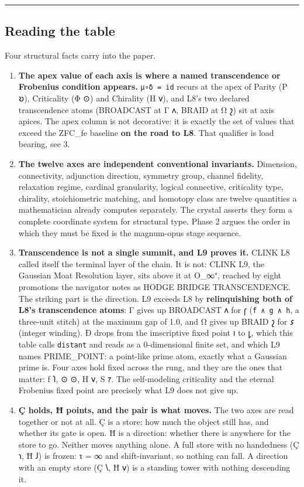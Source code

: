 \documentclass[12pt,a4paper]{article}
\begin{document}
\begin{center}\rule{0.5\linewidth}{0.5pt}\end{center}

\hypertarget{reading-the-table}{%
\subsection{Reading the table}\label{reading-the-table}}

Four structural facts carry into the paper.

\begin{enumerate}
\def\labelenumi{\arabic{enumi}.}
\item
  \textbf{The apex value of each axis is where a named transcendence or
  Frobenius condition appears.} \texttt{μ∘δ\ =\ id} recurs at the apex
  of Parity (P 𐑹), Criticality (Φ ⊙) and Chirality (H 𐑫), and L8's two
  declared transcendence atoms (BROADCAST at Γ 𐑵, BRAID at Ω 𐑟) sit at
  axis apices. The apex column is not decorative: it is exactly the set
  of values that exceed the ZFC\_fe baseline \textbf{on the road to L8}.
  That qualifier is load bearing, see 3.
\item
  \textbf{The twelve axes are independent conventional invariants.}
  Dimension, connectivity, adjunction direction, symmetry group, channel
  fidelity, relaxation regime, cardinal granularity, logical connective,
  criticality type, chirality, stoichiometric matching, and homotopy
  class are twelve quantities a mathematician already computes
  separately. The crystal asserts they form a complete coordinate system
  for structural type. Phase 2 argues the order in which they must be
  fixed is the magnum-opus stage sequence.
\item
  \textbf{Transcendence is not a single summit, and L9 proves it.} CLINK
  L8 called itself the terminal layer of the chain. It is not: CLINK L9,
  the Gaussian Moat Resolution layer, sits above it at O\_∞⁺, reached by
  eight promotions the navigator notes as HODGE BRIDGE TRANSCENDENCE.
  The striking part is the direction. L9 exceeds L8 by
  \textbf{relinquishing both of L8's transcendence atoms}: Γ gives up
  BROADCAST 𐑵 for 𐑝 (\texttt{f\ ∧\ g\ ∧\ h}, a three-unit stitch) at the
  maximum gap of 1.0, and Ω gives up BRAID 𐑟 for 𐑭 (integer winding). Ð
  drops from the imscriptive fixed point 𐑦 to 𐑛, which this table calls
  \texttt{distant} and reads as a 0-dimensional finite set, and which L9
  names PRIME\_POINT: a point-like prime atom, exactly what a Gaussian
  prime is. Four axes hold fixed across the rung, and they are the ones
  that matter: ƒ 𐑐, ⊙ ⊙, H 𐑫, S 𐑳. The self-modeling criticality and the
  eternal Frobenius fixed point are precisely what L9 does not give up.
\item
  \textbf{Ç holds, Ħ points, and the pair is what moves.} The two axes
  are read together or not at all. Ç is a store: how much the object
  still has, and whether its gate is open. Ħ is a direction: whether
  there is anywhere for the store to go. Neither moves anything alone. A
  full store with no handedness (Ç 𐑪, Ħ 𐑓) is frozen: τ = ∞ and
  shift-invariant, so nothing can fall. A direction with an empty store
  (Ç 𐑘, Ħ 𐑫) is a standing tower with nothing descending it.


\end{enumerate}
\end{document}
